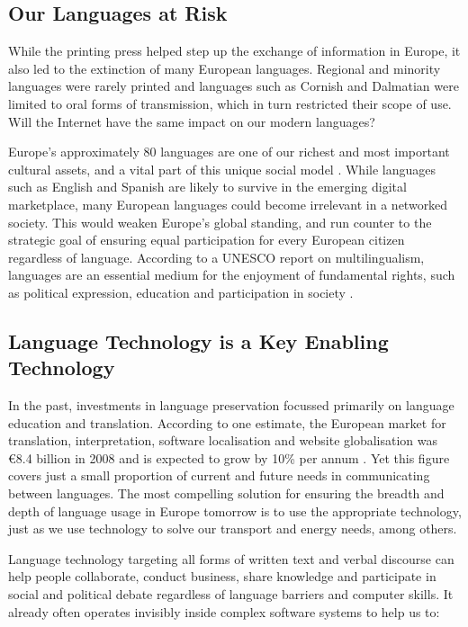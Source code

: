 \documentclass[]{../metanetpaper}
\begin{document}
\begin{multicols}{2}
\subsection{Our Languages at Risk}

While the printing press helped step up the exchange of information in Europe, it also led to the extinction of many European languages. Regional and minority languages were rarely printed and languages such as Cornish and Dalmatian were limited to oral forms of transmission, which in turn restricted their scope of use. Will the Internet have the same impact on our modern languages?


Europe’s approximately 80 languages are one of our richest and most important cultural assets, and a vital part of this unique social model \cite{EC2}. While languages such as English and Spanish are likely to survive in the emerging digital marketplace, many European languages could become irrelevant in a networked society. This would weaken Europe’s global standing, and run counter to the strategic goal of ensuring equal participation for every European citizen regardless of language. According to a UNESCO report on multilingualism, languages are an essential medium for the enjoyment of fundamental rights, such as political expression, education and participation in society \cite{Unesco1}.

\subsection{Language Technology is a Key Enabling Technology}

In the past, investments in language preservation focussed primarily on language education and translation. According to one estimate, the European market for translation, interpretation, software localisation and website globalisation was €8.4 billion in 2008 and is expected to grow by 10\% per annum \cite{EC3}. Yet this figure covers just a small proportion of current and future needs in communicating between languages. The most compelling solution for ensuring the breadth and depth of language usage in Europe tomorrow is to use the appropriate technology, just as we use technology to solve our transport and energy needs, among others.

Language technology targeting all forms of written text and verbal discourse can help people collaborate, conduct business, share knowledge and participate in social and political debate regardless of language barriers and computer skills. It already often operates invisibly inside complex software systems to help us to:


\end{multicols}
\end{document}
